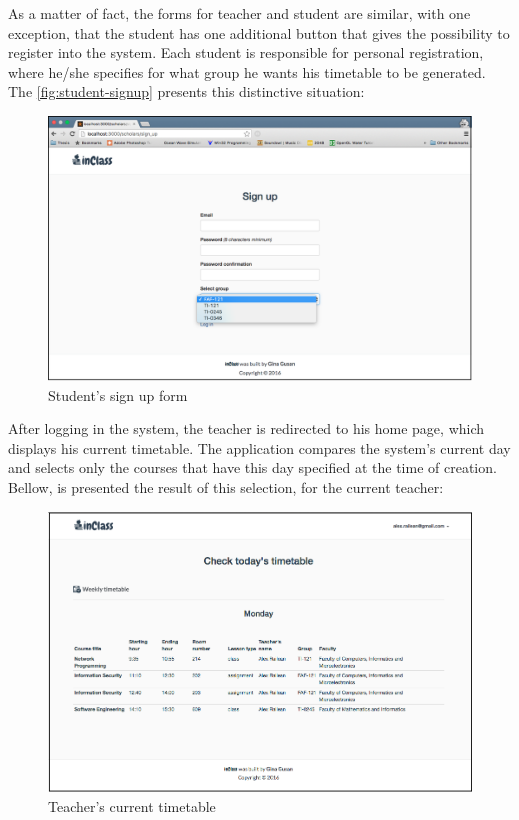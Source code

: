 As a matter of fact, the forms for teacher and student are similar, with one exception, that the student has one additional button that gives the possibility to register into the system. Each student is responsible for personal registration, where he/she specifies for what group he wants his timetable to be generated. The \autoref{fig:student-signup} presents this distinctive situation:

\begin{figure}[H]
\centering
\includegraphics[width=14cm]{Chapter3/student-signup.png}
\caption{Student's sign up form}
\label{fig:student-signup}
\end{figure}

After logging in the system, the teacher is redirected to his home page, which displays his current timetable. The application compares the system's current day and selects only the courses that have this day specified at the time of creation. Bellow, is presented the result of this selection, for the current teacher:

\begin{figure}[H]
\centering
\includegraphics[width=14cm]{Chapter3/teacher-current-timetable.png}
\caption{Teacher's current timetable}
\label{fig:teacher-current-timetable}
\end{figure}

